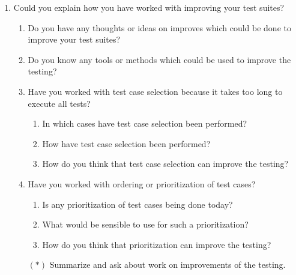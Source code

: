 \begin{enumerate}
  \item Could you explain how you have worked with improving your test suites?
  \begin{enumerate}
    \item Do you have any thoughts or ideas on improves which could be done to improve your test suites?
    \item Do you know any tools or methods which could be used to improve the testing?
    \item Have you worked with test case selection because it takes too long to execute all tests?
    \begin{enumerate}
      \item In which cases have test case selection been performed?
      \item How have test case selection been performed?
      \item How do you think that test case selection can improve the testing?
    \end{enumerate}
    \item Have you worked with ordering or prioritization of test cases?
    \begin{enumerate}
      \item Is any prioritization of test cases being done today?
      \item What would be sensible to use for such a prioritization?
      \item How do you think that prioritization can improve the testing?
    \end{enumerate}
    \item[$(*)$]	 Summarize and ask about work on improvements of the testing.
  \end{enumerate}
\end{enumerate}